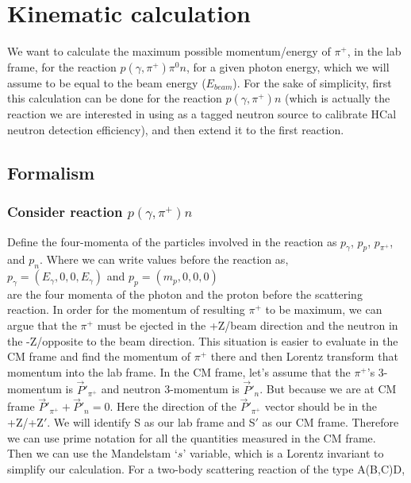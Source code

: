 \section{Kinematic calculation}\label{Kinematic calculation}

We want to calculate the maximum possible momentum/energy of $\pi^+$, in the lab frame, for the reaction $p(\gamma,\pi^{+})\pi{^0}n$, for a given photon energy, which we will assume to be equal to the beam energy ($E_{beam}$). For the sake of simplicity, first this calculation can be done for the reaction $p(\gamma,\pi^{+})n$ (which is actually the reaction we are interested in using as a tagged neutron source to calibrate HCal neutron detection efficiency), and then extend it to the first reaction.

\subsection{Formalism}

\subsubsection{Consider reaction $p(\gamma,\pi^{+})n$}

Define the four-momenta of the particles involved in the reaction as $p_{\gamma}$, $p_{p}$, 
$p_{\pi^{+}}$, and $p_{n}$. Where we can write values before the reaction as,\\
$p_{\gamma} = (E_{\gamma}, 0, 0, E_{\gamma})$ and $p_{p} = (m_p, 0, 0, 0)$ \\ are the four momenta of the photon and the proton before the scattering reaction. In order for the momentum of resulting $\pi^+$ to be maximum, we can argue that the $\pi^+$ must be ejected in the +Z/beam direction and the neutron in the -Z/opposite to the beam direction. This situation is easier to evaluate in the CM frame and find the momentum of $\pi^+$ there and then Lorentz transform that momentum into the lab frame. In the CM frame, let's assume that the $\pi^+$'s 3-momentum is $\vec{P}'_{\pi^+}$ and neutron 3-momentum is $\vec{P}'_{n}$. But because we are at CM frame $\vec{P}'_{\pi^+}+\vec{P}'_{n}=0$. Here the direction of the $\vec{P}'_{\pi^+}$ vector should be in the +Z/+Z$'$. We will identify S as our lab frame and S$'$ as our CM frame. Therefore we can use prime notation for all the quantities measured in the CM frame.\\
Then we can use the Mandelstam `$s$' variable, which is a Lorentz invariant to simplify our calculation. 
For a two-body scattering reaction of the type A(B,C)D,\\

